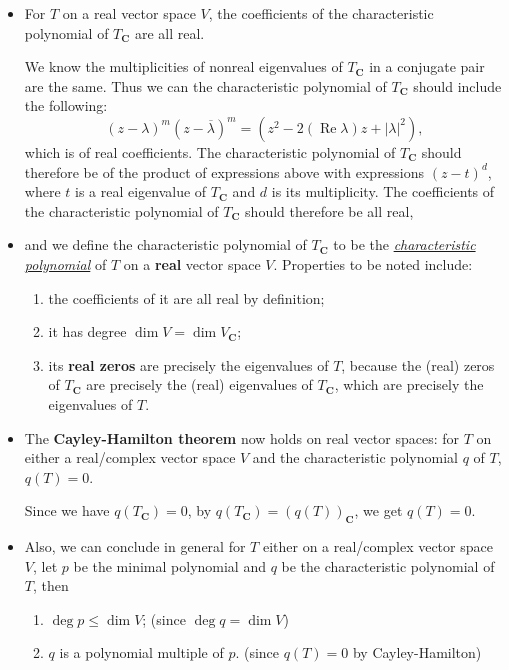 \documentclass{article}
\newcommand{\df}[1]{\ul{\textit{#1}}}
\newcommand{\C}{\mathbf{C}}
\renewcommand{\Re}{\operatorname{Re}}
\renewcommand{\d}{\dim}
\newcommand{\conj}[1]{\overline{#1}}
\begin{document}
\begin{itemize}
    \item For $T$ on a real vector space $V$, the coefficients of the characteristic polynomial of $T_\C$ are all real.

    We know the multiplicities of nonreal eigenvalues of $T_\C$ in a conjugate pair are the same. Thus we can the characteristic polynomial of $T_\C$ should include the following: \[(z-\lambda)^m(z-\conj{\lambda})^m = (z^2 - 2(\Re \lambda)z + |\lambda|^2),\] which is of real coefficients. The characteristic polynomial of $T_\C$ should therefore be of the product of expressions above with expressions $(z-t)^d$, where $t$ is a real eigenvalue of $T_\C$ and $d$ is its multiplicity. The coefficients of the characteristic polynomial of $T_\C$ should therefore be all real,
    \item and we define the characteristic polynomial of $T_\C$ to be the \df{characteristic polynomial} of $T$ on a \textbf{real} vector space $V$. Properties to be noted include:
    \begin{enumerate}[label=(\alph*)]
        \item the coefficients of it are all real by definition;
        \item it has degree $\d V = \d V_\C$;
        \item its \textbf{real zeros} are precisely the eigenvalues of $T$, because the (real) zeros of $T_\C$ are precisely the (real) eigenvalues of $T_\C$, which are precisely the eigenvalues of $T$.
    \end{enumerate}
    \item The \textbf{Cayley-Hamilton theorem} now holds on real vector spaces: for $T$ on either a real/complex vector space $V$ and the characteristic polynomial $q$ of $T$, $q(T) = 0$.
    
    Since we have $q(T_\C) = 0$, by $q(T_\C) = (q(T))_\C$, we get $q(T) = 0$.
    \item Also, we can conclude in general for $T$ either on a real/complex vector space $V$, let $p$ be the minimal polynomial and $q$ be the characteristic polynomial of $T$, then
    \begin{enumerate}[label=(\alph*)]
        \item $\deg p \leq \d V$; (since $\deg q = \d V$)
        \item $q$ is a polynomial multiple of $p$. (since $q(T) = 0$ by Cayley-Hamilton)
    \end{enumerate}
\end{itemize}
\end{document}

